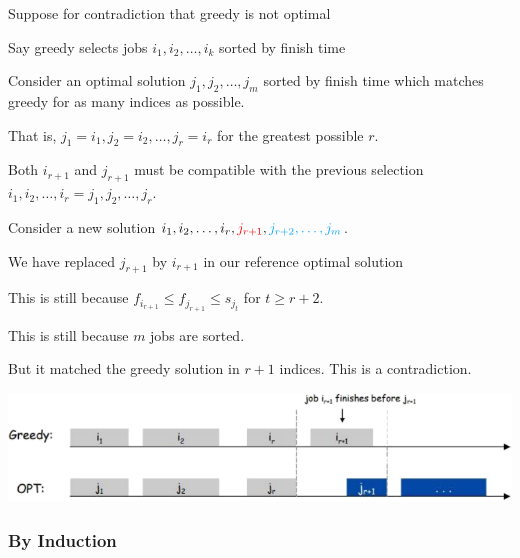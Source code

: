 \begin{listu}
    \item Suppose for contradiction that greedy is not optimal

    \item Say greedy selects jobs $i_1, i_2, \dots, i_k$ sorted by finish time

    \item Consider an optimal solution $j_1, j_2, \dots, j_m$ sorted by finish time which matches greedy for as many indices as possible.

    That is, $j_1 = i_1, j_2 = i_2, \dots, j_r = i_r$ for the greatest possible $r$.

    \item Both $i_{r+1}$ and $j_{r+1}$ must be compatible with the previous selection $i_1, i_2, \dots, i_r = j_1, j_2, \dots, j_r$.

    \item Consider a new solution $i_1, i_2, \dots, i_r, {\color{red}j_{r+1}}, {\color{lightBlue}j_{r+2}, \dots, j_m}$.

    \begin{listu}
        \item We have replaced $j_{r+1}$ by $i_{r+1}$ in our reference optimal solution
        \item This is still  because $f_{i_{r+1}} \le f_{j_{r+1}} \le s_{j_{t}}$ for $t \ge r+2$.
        \item This is still  because $m$ jobs are sorted.
        \item But it matched the greedy solution in $r + 1$ indices. This is a contradiction.
    \end{listu}
\end{listu}

\begin{center}
    \includegraphics[width=0.67\linewidth]{figures/interval-scheduling-contradiction.png}
\end{center}

\subsubsection{By Induction}

